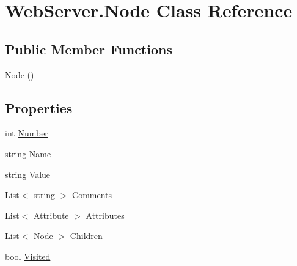 \hypertarget{class_web_server_1_1_node}{}\section{Web\+Server.\+Node Class Reference}
\label{class_web_server_1_1_node}


 


\subsection*{Public Member Functions}
\begin{DoxyCompactItemize}
\item 
\hyperlink{class_web_server_1_1_node_a120c3b8357a7b3c5b4b5871816f63cdd}{Node} ()
\end{DoxyCompactItemize}
\subsection*{Properties}
\begin{DoxyCompactItemize}
\item 
int \hyperlink{class_web_server_1_1_node_a5dcd1fef3300cfd6482a5a330f77ca8f}{Number}
\item 
string \hyperlink{class_web_server_1_1_node_af25fa6fe6325962eabc220cc43413a41}{Name}
\item 
string \hyperlink{class_web_server_1_1_node_a97c770bc5290d2d37bfea30a67d5f839}{Value}
\item 
List$<$ string $>$ \hyperlink{class_web_server_1_1_node_a6df5cac89012beddce9bc43b2dc82f8c}{Comments}
\item 
List$<$ \hyperlink{class_web_server_1_1_attribute}{Attribute} $>$ \hyperlink{class_web_server_1_1_node_a1eab0c9c9079b2b18c546dc293fa7dc5}{Attributes}
\item 
List$<$ \hyperlink{class_web_server_1_1_node}{Node} $>$ \hyperlink{class_web_server_1_1_node_a54936fd455c2d73feb51bff4525d1910}{Children}
\item 
bool \hyperlink{class_web_server_1_1_node_a09aaee2c59baa9487e330466ab4ff145}{Visited}
\end{DoxyCompactItemize}



